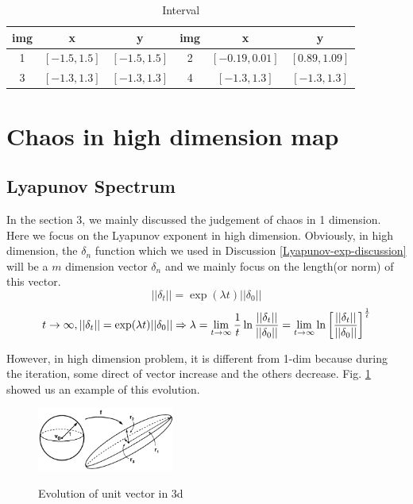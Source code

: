 \documentclass[12pt]{article}
\theoremstyle{plain}
\begin{document}
\begin{table}[H]
\centering  
\caption{Interval}  
\begin{tabular}{|c|c|c|c|c|c|}
\hline
img & x & y & img & x & y\\
\hline
1 & $[-1.5, 1.5]$ & $[-1.5, 1.5]$ & 2 & $[-0.19, 0.01]$ & $[0.89, 1.09]$ \\
3 & $[-1.3, 1.3]$ & $[-1.3, 1.3]$ & 4 & $[-1.3, 1.3]$   & $[-1.3, 1.3]$  \\
\hline
\end{tabular}  
\end{table} 






















\newpage
\section{Chaos in high dimension map}
\subsection{Lyapunov Spectrum}
In the section 3, we mainly discussed the judgement of chaos in 1 dimension. Here we focus on the Lyapunov exponent in high dimension. Obviously, in high dimension, the $\delta_n$ function which we used in Discussion \ref{Lyapunov-exp-discussion} will be a $m$ dimension vector $\delta_n$ and we mainly focus on the length(or norm) of this vector.
$$
||\delta_t|| = \exp(\lambda t) ||\delta_0||
$$
$$
t\rightarrow \infty, \mathbf ||\delta_t|| = \exp(\lambda t)\mathbf||\delta_0||
\Rightarrow \lambda = \lim_{t \rightarrow \infty}{1\over t}\ln{\mathbf||\delta_t|| \over \mathbf ||\delta_0||}
= \lim_{t \rightarrow \infty}\ln\left[\mathbf||\delta_t|| \over \mathbf ||\delta_0||\right]^{1\over t}
$$

However, in high dimension problem, it is different from 1-dim because during the iteration, some direct of vector increase and the others decrease. Fig. \ref{Lyapunov-spec-proof-1} showed us an example of this evolution.

\begin{figure}[H]
\begin{center}
\includegraphics[width=0.4\textwidth]{figure/section5/Lyapunov-spec-proof-1.png} \\
\caption{Evolution of unit vector in 3d}\label{Lyapunov-spec-proof-1}
\end{center}
\end{figure}
\end{document}
